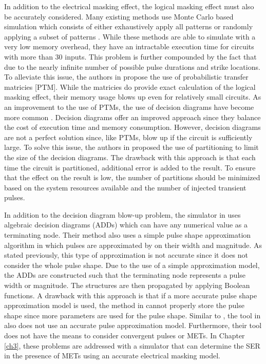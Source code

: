 In addition to the electrical masking effect, the logical masking effect must also be accurately considered. Many existing methods use Monte Carlo based simulation which consists of either exhaustively apply all patterns or randomly applying a subset of patterns \cite{Accurate_Masking,PARAM_DESC,SEMM,SERA,SETA_LA}. While these methods are able to simulate with a very low memory overhead, they have an intractable execution time for circuits with more than 30 inputs. This problem is further compounded by the fact that due to the nearly infinite number of possible pulse durations and strike locations. To alleviate this issue, the authors in \cite{PTM} propose the use of probabilistic transfer matricies [PTM]. While the matricies do provide exact calculation of the logical masking effect, their memory usage blows up even for relatively small circuits. As an improvement to the use of PTMs, the use of decision diagrams have become more common \cite{FASER,MARS_C}. Decision diagrams offer an improved approach since they balance the cost of execution time and memory consumption. However, decision diagrams are not a perfect solution since, like PTMs, blow up if the circuit is sufficiently large. To solve this issue, the authors in \cite{FASER} proposed the use of partitioning to limit the size of the decision diagrams. The drawback with this approach is that each time the circuit is partitioned, additional error is added to the result. To ensure that the effect on the result is low, the number of partitions should be minimized based on the system resources available and the number of injected transient pulses.

In addition to the decision diagram blow-up problem, the simulator in \cite{MARS_C} uses algebraic decision diagrams (ADDs) which can have any numerical value as a terminating node. Their method also uses a simple pulse shape approximation algorithm in which pulses are approximated by on their width and magnitude. As stated previously, this type of approximation is not accurate since it does not consider the whole pulse shape. Due to the use of a simple approximation model, the ADDs are constructed such that the terminating node represents a pulse width or magnitude. The structures are then propagated by applying Boolean functions. A drawback with this approach is that if a more accurate pulse shape approximation model is used, the method in \cite{MARS_C} cannot properly store the pulse shape since more parameters are used for the pulse shape. Similar to \cite{MARS_C}, the tool in \cite{FASER} also does not use an accurate pulse approximation model. Furthermore, their tool does not have the means to consider convergent pulses or METs. In Chapter \ref{ch3}, these problems are addressed with a simulator that can determine the SER in the presence of METs using an accurate electrical masking model. 

